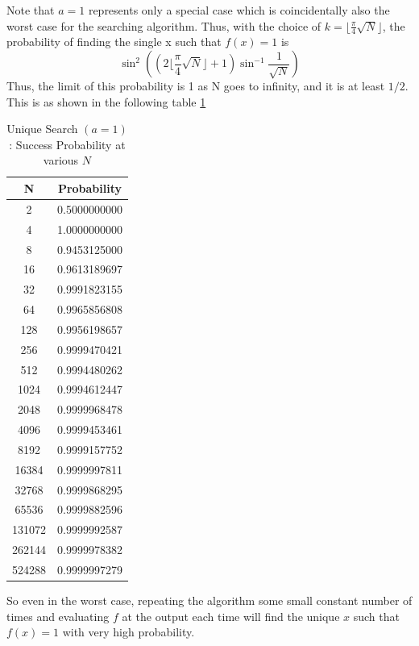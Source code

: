 Note that $a=1$ represents only a special case which is coincidentally also the worst case for the searching algorithm. Thus, with the choice of $k=\lfloor \frac{\pi}{4}\sqrt{N} \rfloor$, the probability of finding the single x such that $f(x)=1$ is
\[
\sin^2 \left(\left(2\lfloor \frac{\pi}{4}\sqrt{N} \rfloor+1\right)\sin^{-1} \frac{1}{\sqrt{N}}\right)
\]
Thus, the limit of this probability is 1 as N goes to infinity, and it is at least $1/2$. This is as shown in the following table \ref{tab:Probdist}

\begin{table}[ht]
    \centering
    \begin{tabular}{c|c}
        N & Probability\\
        \hline
        2	& 0.5000000000 \\
        4	& 1.0000000000 \\
        8	& 0.9453125000 \\
        16	& 0.9613189697 \\
        32	& 0.9991823155 \\
        64	& 0.9965856808 \\
        128	& 0.9956198657 \\
        256	& 0.9999470421 \\
        512	& 0.9994480262 \\
        1024	& 0.9994612447 \\
        2048	& 0.9999968478 \\
        4096	& 0.9999453461 \\
        8192	& 0.9999157752 \\
        16384	& 0.9999997811 \\
        32768	& 0.9999868295 \\
        65536	& 0.9999882596 \\
        131072	& 0.9999992587 \\
        262144	& 0.9999978382 \\
        524288	& 0.9999997279 \\
    \end{tabular}
    \caption{Unique Search $(a=1)$: Success Probability at various $N$}
    \label{tab:Probdist}
\end{table}
So even in the worst case, repeating the algorithm some small constant number of times and evaluating $f$ at the output each time will find the unique $x$ such that $f(x)=1$ with very high probability.

